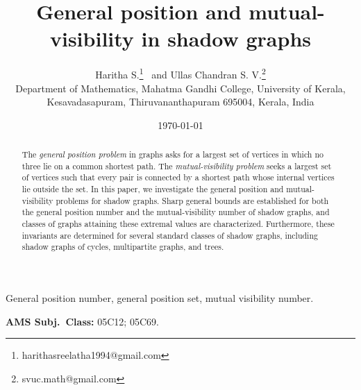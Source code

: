 \documentclass[a4paper,12pt]{article}
\begin{document}
\title{General position and mutual-visibility in shadow graphs}	
		
\author{Haritha S.\footnote{harithasreelatha1994@gmail.com} \ and Ullas Chandran S. V.\footnote{svuc.math@gmail.com}
\\
\small Department of Mathematics, Mahatma Gandhi College, University of Kerala, \\ \small Kesavadasapuram, Thiruvananthapuram 695004, Kerala, India\\
}
\date{\today}
\maketitle
\begin{abstract}
The \emph{general position problem} in graphs asks for a largest set of vertices in which no three lie on a common shortest path. The \emph{mutual-visibility problem} seeks a largest set of vertices such that every pair is connected by a shortest path whose internal vertices lie outside the set. In this paper, we investigate the general position and mutual-visibility problems for shadow graphs. Sharp general bounds are established for both the general position number and the mutual-visibility number of shadow graphs, and classes of graphs attaining these extremal values are characterized. Furthermore, these invariants are determined for several standard classes of shadow graphs, including shadow graphs of cycles, multipartite graphs, and trees.

\end{abstract}
 General position number, general position set, mutual visibility number.

\medskip\noindent

{\bf AMS Subj.\ Class:} 05C12; 05C69.


\end{document}
